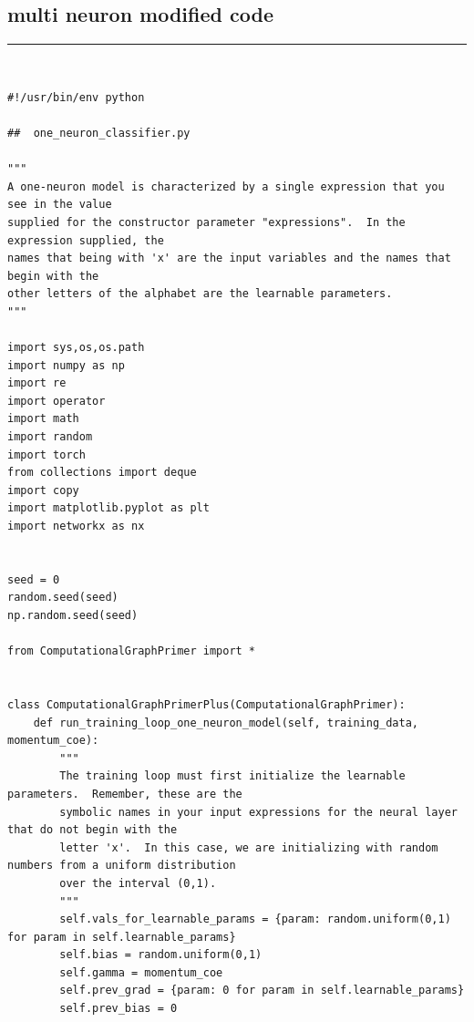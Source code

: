 \documentclass{article}
\begin{document}
\subsection{multi neuron modified code}
\textcolor{red}{\rule[-0.3in]{6.1in}{0.03in}}\\
\vspace{-0.05in}
\begin{verbatim}
#!/usr/bin/env python

##  one_neuron_classifier.py

"""
A one-neuron model is characterized by a single expression that you see in the value
supplied for the constructor parameter "expressions".  In the expression supplied, the
names that being with 'x' are the input variables and the names that begin with the
other letters of the alphabet are the learnable parameters.
"""

import sys,os,os.path
import numpy as np
import re
import operator
import math
import random
import torch
from collections import deque
import copy
import matplotlib.pyplot as plt
import networkx as nx


seed = 0
random.seed(seed)
np.random.seed(seed)

from ComputationalGraphPrimer import *


class ComputationalGraphPrimerPlus(ComputationalGraphPrimer):
    def run_training_loop_one_neuron_model(self, training_data, momentum_coe):
        """
        The training loop must first initialize the learnable parameters.  Remember, these are the
        symbolic names in your input expressions for the neural layer that do not begin with the
        letter 'x'.  In this case, we are initializing with random numbers from a uniform distribution
        over the interval (0,1).
        """
        self.vals_for_learnable_params = {param: random.uniform(0,1) for param in self.learnable_params}
        self.bias = random.uniform(0,1)
        self.gamma = momentum_coe
        self.prev_grad = {param: 0 for param in self.learnable_params}
        self.prev_bias = 0
        

\end{verbatim}
\end{document}
